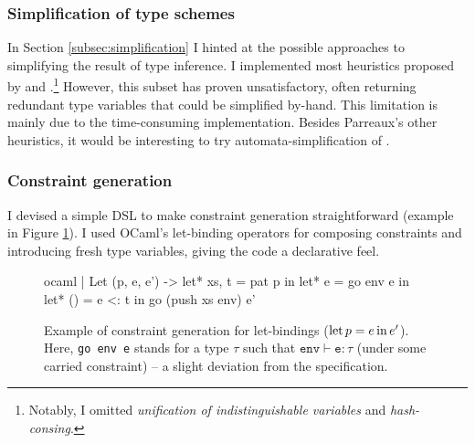 \subsubsection{Simplification of type schemes} In Section \ref{subsec:simplification} I hinted at the possible approaches to simplifying the result of type inference. I implemented most heuristics proposed by \textcite{simple-sub} and \textcite{mlstruct}.\footnote{Notably, I omitted \emph{unification of indistinguishable variables} and \emph{hash-consing}.} 
However, this subset has proven unsatisfactory, often returning redundant type variables that could be simplified by-hand. This limitation is mainly due to the time-consuming implementation. 
Besides Parreaux's other heuristics, it would be interesting to try automata-simplification of \textcite[Chapter~7]{dolan-thesis}.

\subsubsection{Constraint generation} I devised a simple DSL to make constraint generation straightforward (example in Figure \ref{fig:cstr-gen}). I used OCaml's let-binding operators for composing constraints and introducing fresh type variables, giving the code a declarative feel. 

\begin{figure}
    \centering
\begin{cminted}{ocaml}
| Let (p, e, e') ->
    let* xs, t = pat p in
    let* e = go env e in
    let* () = e <: t in
    go (push xs env) e'
\end{cminted}
    \caption{Example of constraint generation for \fabric{} let-bindings ($\mathrm{let}\,{p}={e}\,\mathrm{in}\, e'$). Here, \texttt{go env e} stands for a type $\tau$ such that $\texttt{env} \vdash \texttt{e} : \tau$ (under some carried constraint) -- a slight deviation from the specification.}
    \label{fig:cstr-gen}
\end{figure}

